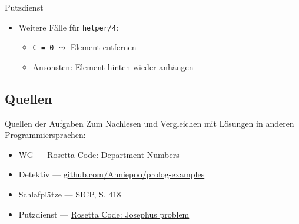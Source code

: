 \documentclass{beamer}
\begin{document}
\begin{frame}{Putzdienst}

	\begin{itemize}
		\item Weitere Fälle für \texttt{helper/4}:
		\begin{itemize}
			\item \texttt{C = 0} $\leadsto$ Element entfernen
			\item Ansonsten: Element hinten wieder anhängen
		\end{itemize}
	\end{itemize}
\end{frame}

\subsection{Quellen}

\begin{frame}{Quellen der Aufgaben}
	Zum Nachlesen und Vergleichen mit Lösungen in anderen Programmiersprachen:
	\begin{itemize}
		\item WG --- \href{https://rosettacode.org/wiki/Department_Numbers}{Rosetta Code: Department Numbers}
		\item Detektiv --- \href{https://github.com/Anniepoo/prolog-examples/blob/master/newdetective.pl}{github.com/Anniepoo/prolog-examples}
		\item Schlafplätze --- SICP, S. 418
		\item Putzdienst --- \href{https://rosettacode.org/wiki/Josephus_problem}{Rosetta Code: Josephus problem}
	\end{itemize}
\end{frame}

\end{document}
